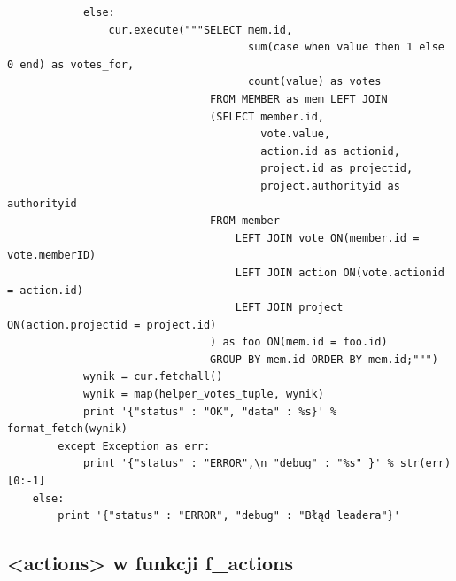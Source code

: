 \documentclass{article}
\begin{document}
\begin{verbatim}
            else:
                cur.execute("""SELECT mem.id,
                                      sum(case when value then 1 else 0 end) as votes_for,
                                      count(value) as votes 
                                FROM MEMBER as mem LEFT JOIN
                                (SELECT member.id,
                                        vote.value,
                                        action.id as actionid, 
                                        project.id as projectid, 
                                        project.authorityid as authorityid
                                FROM member
                                    LEFT JOIN vote ON(member.id = vote.memberID)
                                    LEFT JOIN action ON(vote.actionid = action.id)
                                    LEFT JOIN project ON(action.projectid = project.id)
                                ) as foo ON(mem.id = foo.id)
                                GROUP BY mem.id ORDER BY mem.id;""")
            wynik = cur.fetchall()
            wynik = map(helper_votes_tuple, wynik)
            print '{"status" : "OK", "data" : %s}' % format_fetch(wynik)   
        except Exception as err:  
            print '{"status" : "ERROR",\n "debug" : "%s" }' % str(err)[0:-1]       
    else:
        print '{"status" : "ERROR", "debug" : "Błąd leadera"}'   
\end{verbatim}












\newpage
\subsection{<actions> w funkcji f\_actions }
\end{document}
